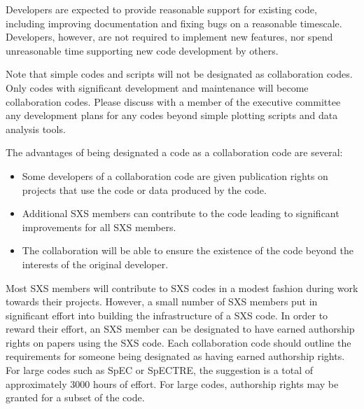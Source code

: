 \documentclass[12pt]{article}
\begin{document}
Developers are expected to provide reasonable support for existing
code, including improving documentation and fixing bugs on a
reasonable timescale.  Developers, however, are not required to
implement new features, nor spend unreasonable time supporting new
code development by others.

Note that simple codes and scripts will not be designated as
collaboration codes.  Only codes with significant development and
maintenance will become collaboration codes.  Please discuss with a
member of the executive committee any development plans for any codes
beyond simple plotting scripts and data analysis tools.

The advantages of being designated a code as a collaboration code are
several:
\begin{itemize}
\setlength\itemsep{-0.25em}
\item Some developers of a collaboration code are given publication
  rights on projects that use the code or data produced by the code.
\item Additional SXS members can contribute to the code leading to
  significant improvements for all SXS members.
\item The collaboration will be able to ensure the existence of the
  code beyond the interests of the original developer.
\end{itemize}

Most SXS members will contribute to SXS codes in a modest fashion
during work towards their projects.  However, a small number of SXS
members put in significant effort into building the infrastructure of
a SXS code. In order to reward their effort, an SXS member can be
designated to have earned authorship rights on papers using the SXS
code.  Each collaboration code should outline the requirements for
someone being designated as having earned authorship rights.  For
large codes such as SpEC or SpECTRE, the suggestion is a total of
approximately 3000 hours of effort.  For large codes, authorship
rights may be granted for a subset of the code.
\end{document}
